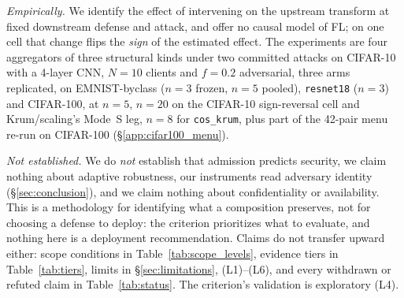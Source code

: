 \documentclass{article}
\begin{document}
\begin{framed}
\emph{Empirically.} We identify the effect of intervening on the upstream transform at fixed downstream
defense and attack, and offer no causal model of FL; on one cell that change flips the
\emph{sign} of the estimated effect. The experiments are four aggregators of three structural kinds
under two committed attacks on CIFAR-10 with a 4-layer CNN, $N{=}10$ clients and $f{=}0.2$
adversarial, three arms replicated, on EMNIST-byclass ($n{=}3$ frozen,
$n{=}5$ pooled), \texttt{resnet18} ($n{=}3$) and CIFAR-100, at $n{=}5$, $n{=}20$ on the CIFAR-10 sign-reversal cell and
Krum/scaling's Mode~S leg, $n{=}8$ for \texttt{cos\_krum}, plus part of the 42-pair menu re-run on CIFAR-100 (§\ref{app:cifar100_menu}).

\emph{Not established.} We do \emph{not} establish that admission predicts security, we claim nothing
about adaptive robustness, our instruments read adversary identity (§\ref{sec:conclusion}), and we claim
nothing about confidentiality or availability. This is a
methodology for identifying what a composition preserves, not for choosing a defense to deploy: the
criterion prioritizes what to evaluate, and nothing here is a deployment recommendation. Claims
do not transfer upward either: scope conditions in Table~\ref{tab:scope_levels}, evidence tiers in
Table~\ref{tab:tiers}, limits in §\ref{sec:limitations}, (L1)--(L6), and every withdrawn
or refuted claim in Table~\ref{tab:status}. The criterion's validation is exploratory (L4).
\end{framed}
\end{document}
